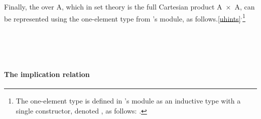 \ccpad
Finally, the  over \ab A, which in set theory is the full Cartesian product \ab A~\af ×~\ab A, can be represented using the one-element type from \typetopology's  module, as follows.\cref{uhints}$^, $\footnote{%
The one-element type is defined in \typetopology's  module as an inductive type with a single constructor, denoted , as follows: \AgdaSpace{}%
\AgdaSpace{}%
\AgdaSymbol{\{}\AgdaSymbol{\}}\AgdaSpace{}%
\AgdaSymbol{:}\AgdaSpace{}%
\AgdaSpace{}%
\AgdaSpace{}%
\AgdaSpace{}\AgdaSpace{}%
\AgdaSymbol{:}\AgdaSpace{}%
.}
\ccpad
\begin{code}%
\>[1]\AgdaSpace{}%
\AgdaSpace{}%
\AgdaSpace{}%
\AgdaSpace{}%
\AgdaSymbol{(}\AgdaSymbol{)}\<%
\\
%
\\[\AgdaEmptyExtraSkip]%
%
\>[1]\AgdaSpace{}%
\AgdaSymbol{:}\AgdaSpace{}%
\AgdaSpace{}%
\AgdaSpace{}%
\<%
\\
%
\>[1]\AgdaSpace{}%
\AgdaSpace{}%
\AgdaSpace{}%
\AgdaSymbol{=}\AgdaSpace{}%
\<%
\end{code}


\paragraph*{The implication relation}


